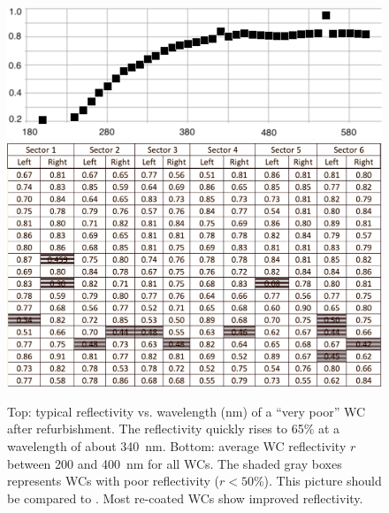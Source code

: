 \begin{figure}[ht]
	\centering
	\includegraphics[width=0.98\columnwidth,keepaspectratio]{img/winstoConeSample1Reflectivity.png}
	\includegraphics[width=0.98\columnwidth,keepaspectratio]{img/wcStatusAfter.png}
	\caption{Top: typical reflectivity vs. wavelength (nm) of a ``very poor'' WC after refurbishment. The
          reflectivity quickly rises to 65\% at a wavelength of about 340~nm. Bottom: average WC reflectivity $r$
          between 200 and 400~nm for all WCs. The shaded gray boxes represents WCs with poor reflectivity
          ($r < 50$\%). This picture should be compared to . Most re-coated WCs show improved
          reflectivity.}
	\label{fig:wcStatusAfter}
\end{figure}

